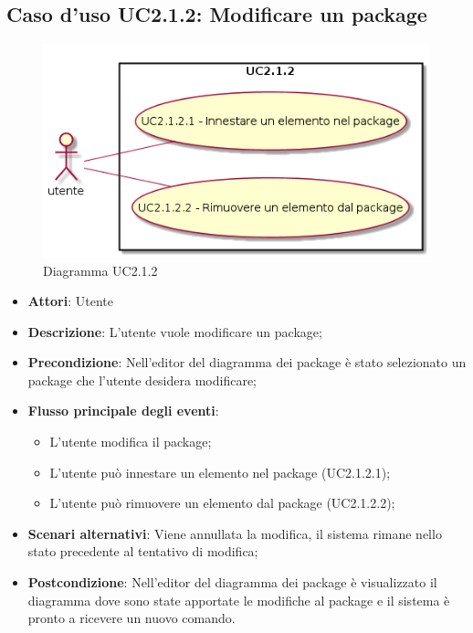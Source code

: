 \documentclass[../AnalisiDeiRequisiti.tex]{subfiles}
\begin{document}
	\subsection{Caso d'uso UC2.1.2: Modificare un package}
	\begin{figure} [H]
		\centering
		\includegraphics[scale=0.45]{./Figures/UC2-1-2.png}
		\caption{Diagramma UC2.1.2}\label{}
	\end{figure}
	\begin{itemize}
		\item \textbf{Attori}: Utente
		\item \textbf{Descrizione}: L'utente vuole modificare un package;
		\item \textbf{Precondizione}: Nell'editor del diagramma dei package è stato selezionato un package che l'utente desidera modificare;
		\item \textbf{Flusso principale degli eventi}: \begin{itemize}
			\item L'utente modifica il package;
			\item L'utente può innestare un elemento nel package (UC2.1.2.1);
			\item L'utente può rimuovere un elemento dal package (UC2.1.2.2);
		\end{itemize}
		\item \textbf{Scenari alternativi}: Viene annullata la modifica, il sistema	rimane nello stato precedente al tentativo di modifica;
		\item \textbf{Postcondizione}: Nell'editor del diagramma dei package è visualizzato il diagramma dove sono state apportate le modifiche al package e il sistema è pronto a ricevere un nuovo comando.
	\end{itemize}
\end{document}
